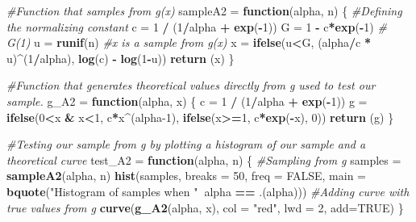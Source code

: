 \documentclass[
]{article}
\newenvironment{Shaded}{\begin{snugshade}}{\end{snugshade}}
\newcommand{\CommentTok}[1]{\textcolor[rgb]{0.56,0.35,0.01}{\textit{#1}}}
\newcommand{\ControlFlowTok}[1]{\textcolor[rgb]{0.13,0.29,0.53}{\textbf{#1}}}
\newcommand{\DataTypeTok}[1]{\textcolor[rgb]{0.13,0.29,0.53}{#1}}
\newcommand{\DecValTok}[1]{\textcolor[rgb]{0.00,0.00,0.81}{#1}}
\newcommand{\KeywordTok}[1]{\textcolor[rgb]{0.13,0.29,0.53}{\textbf{#1}}}
\newcommand{\NormalTok}[1]{#1}
\newcommand{\OperatorTok}[1]{\textcolor[rgb]{0.81,0.36,0.00}{\textbf{#1}}}
\newcommand{\OtherTok}[1]{\textcolor[rgb]{0.56,0.35,0.01}{#1}}
\newcommand{\StringTok}[1]{\textcolor[rgb]{0.31,0.60,0.02}{#1}}
\begin{document}
\begin{Shaded}
\begin{Highlighting}[]
\CommentTok{#Function that samples from g(x)}
\NormalTok{sampleA2 =}\StringTok{ }\ControlFlowTok{function}\NormalTok{(alpha, n) \{}
  \CommentTok{#Defining the normalizing constant}
\NormalTok{  c =}\StringTok{ }\DecValTok{1} \OperatorTok{/}\StringTok{ }\NormalTok{(}\DecValTok{1}\OperatorTok{/}\NormalTok{alpha }\OperatorTok{+}\StringTok{ }\KeywordTok{exp}\NormalTok{(}\OperatorTok{-}\DecValTok{1}\NormalTok{))}
\NormalTok{  G =}\StringTok{ }\DecValTok{1} \OperatorTok{-}\StringTok{ }\NormalTok{c}\OperatorTok{*}\KeywordTok{exp}\NormalTok{(}\OperatorTok{-}\DecValTok{1}\NormalTok{) }\CommentTok{# G(1)}
\NormalTok{  u =}\StringTok{ }\KeywordTok{runif}\NormalTok{(n)}
  \CommentTok{#x is a sample from g(x)}
\NormalTok{  x =}\StringTok{ }\KeywordTok{ifelse}\NormalTok{(u}\OperatorTok{<}\NormalTok{G, (alpha}\OperatorTok{/}\NormalTok{c }\OperatorTok{*}\StringTok{ }\NormalTok{u)}\OperatorTok{^}\NormalTok{(}\DecValTok{1}\OperatorTok{/}\NormalTok{alpha), }\KeywordTok{log}\NormalTok{(c) }\OperatorTok{-}\StringTok{ }\KeywordTok{log}\NormalTok{(}\DecValTok{1}\OperatorTok{-}\NormalTok{u))}
  \KeywordTok{return}\NormalTok{ (x)}
\NormalTok{\}}

\CommentTok{#Function that generates theoretical values directly from g used to test our sample.}
\NormalTok{g_A2 =}\StringTok{ }\ControlFlowTok{function}\NormalTok{(alpha, x) \{}
\NormalTok{  c =}\StringTok{ }\DecValTok{1} \OperatorTok{/}\StringTok{ }\NormalTok{(}\DecValTok{1}\OperatorTok{/}\NormalTok{alpha }\OperatorTok{+}\StringTok{ }\KeywordTok{exp}\NormalTok{(}\OperatorTok{-}\DecValTok{1}\NormalTok{))}
\NormalTok{  g =}\StringTok{ }\KeywordTok{ifelse}\NormalTok{(}\DecValTok{0}\OperatorTok{<}\NormalTok{x }\OperatorTok{&}\StringTok{ }\NormalTok{x}\OperatorTok{<}\DecValTok{1}\NormalTok{, c}\OperatorTok{*}\NormalTok{x}\OperatorTok{^}\NormalTok{(alpha}\DecValTok{-1}\NormalTok{), }\KeywordTok{ifelse}\NormalTok{(x}\OperatorTok{>=}\DecValTok{1}\NormalTok{, c}\OperatorTok{*}\KeywordTok{exp}\NormalTok{(}\OperatorTok{-}\NormalTok{x), }\DecValTok{0}\NormalTok{))}
  \KeywordTok{return}\NormalTok{ (g)}
\NormalTok{\}}

\CommentTok{#Testing our sample from g by plotting a histogram of our sample and a theoretical curve}
\NormalTok{test_A2 =}\StringTok{ }\ControlFlowTok{function}\NormalTok{(alpha, n) \{}
  \CommentTok{#Sampling from g}
\NormalTok{  samples =}\StringTok{ }\KeywordTok{sampleA2}\NormalTok{(alpha, n)}
  \KeywordTok{hist}\NormalTok{(samples, }\DataTypeTok{breaks =} \DecValTok{50}\NormalTok{, }\DataTypeTok{freq =} \OtherTok{FALSE}\NormalTok{, }\DataTypeTok{main =} \KeywordTok{bquote}\NormalTok{(}\StringTok{"Histogram of samples when "}\OperatorTok{~}\NormalTok{alpha }\OperatorTok{==}\StringTok{ }\NormalTok{.(alpha)))}
  \CommentTok{#Adding curve with true values from g}
  \KeywordTok{curve}\NormalTok{(}\KeywordTok{g_A2}\NormalTok{(alpha, x), }\DataTypeTok{col =} \StringTok{"red"}\NormalTok{, }\DataTypeTok{lwd =} \DecValTok{2}\NormalTok{, }\DataTypeTok{add=}\OtherTok{TRUE}\NormalTok{)}
\NormalTok{\}}


\end{Highlighting}
\end{Shaded}
\end{document}
